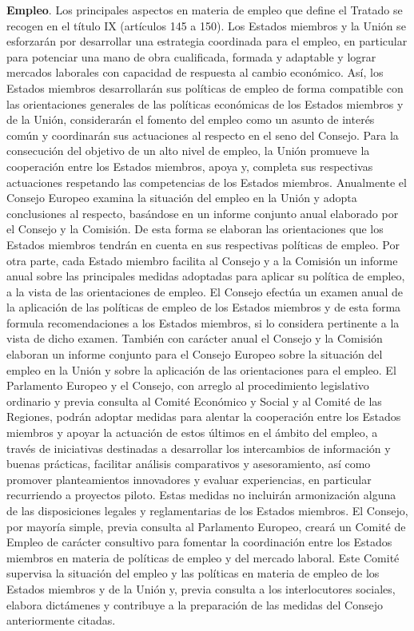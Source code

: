 \documentclass[10pt,a4paper]{article}
\begin{document}
\textbf{Empleo}. Los principales aspectos en materia de empleo que define el Tratado se recogen en el título IX (artículos 145 a 150). Los Estados miembros y la Unión se esforzarán por desarrollar una estrategia coordinada para el empleo, en particular para potenciar una mano de obra cualificada, formada y adaptable y lograr mercados laborales con capacidad de respuesta al cambio económico. Así, los Estados miembros desarrollarán sus políticas de empleo de forma compatible con las orientaciones generales de las políticas económicas de los Estados miembros y de la Unión, considerarán el fomento del empleo como un asunto de interés común y coordinarán sus actuaciones al respecto en el seno del Consejo. Para la consecución del objetivo de un alto nivel de empleo, la Unión promueve la cooperación entre los Estados miembros, apoya y, completa sus respectivas actuaciones respetando las competencias de los Estados miembros. Anualmente el Consejo Europeo examina la situación del empleo en la Unión y adopta conclusiones al respecto, basándose en un informe conjunto anual elaborado por el Consejo y la Comisión. De esta forma se elaboran las orientaciones que los Estados miembros tendrán en cuenta en sus respectivas políticas de empleo. Por otra parte, cada Estado miembro facilita al Consejo y a la Comisión un informe anual sobre las principales medidas adoptadas para aplicar su política de empleo, a la vista de las orientaciones de empleo. El Consejo efectúa un examen anual de la aplicación de las políticas de empleo de los Estados miembros y de esta forma formula recomendaciones a los Estados miembros, si lo considera pertinente a la vista de dicho examen. También con carácter anual el Consejo y la Comisión elaboran un informe conjunto para el Consejo Europeo sobre la situación del empleo en la Unión y sobre la aplicación de las orientaciones para el empleo. El Parlamento Europeo y el Consejo, con arreglo al procedimiento legislativo ordinario y previa consulta al Comité Económico y Social y al Comité de las Regiones, podrán adoptar medidas para alentar la cooperación entre los Estados miembros y apoyar la actuación de estos últimos en el ámbito del empleo, a través de iniciativas destinadas a desarrollar los intercambios de información y buenas prácticas, facilitar análisis comparativos y asesoramiento, así como promover planteamientos innovadores y evaluar experiencias, en particular recurriendo a proyectos piloto. Estas medidas no incluirán armonización alguna de las disposiciones legales y reglamentarias de los Estados miembros. El Consejo, por mayoría simple, previa consulta al Parlamento Europeo, creará un Comité de Empleo de carácter consultivo para fomentar la coordinación entre los Estados miembros en materia de políticas de empleo y del mercado laboral. Este Comité supervisa la situación del empleo y las políticas en materia de empleo de los Estados miembros y de la Unión y, previa consulta a los interlocutores sociales, elabora dictámenes y contribuye a la preparación de las medidas del Consejo anteriormente citadas.
\end{document}

